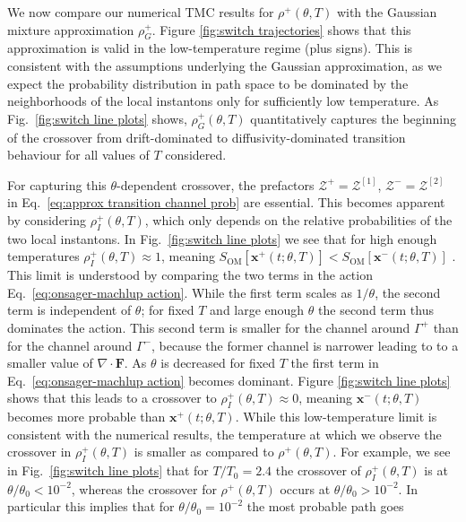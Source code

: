 We now compare our numerical TMC results for $\rho^{+}(\theta,T)$ with
the Gaussian mixture approximation $\rho_{G}^{+}$. Figure \ref{fig:switch trajectories} shows that this approximation is valid in the low-temperature regime
(plus signs). This is consistent with the assumptions underlying the
Gaussian approximation, as we expect the probability distribution
in path space to be dominated by the neighborhoods of the local instantons
only for sufficiently low temperature. As Fig.~\ref{fig:switch line plots} shows, $\rho_{G}^{+}(\theta,T)$ quantitatively captures the beginning
of the crossover from drift-dominated to diffusivity-dominated transition
behaviour for all values of $T$ considered.

For capturing this $\theta$-dependent crossover, the prefactors $\mathcal{Z}^{+}=\mathcal{Z}^{[1]}$,
$\mathcal{Z}^{-}=\mathcal{Z}^{[2]}$ in Eq.~\ref{eq:approx transition channel prob}
are essential. This becomes apparent by considering $\rho_{I}^{+}(\theta,T)$,
which only depends on the relative probabilities of the two local
instantons. In Fig.~\ref{fig:switch line plots} we see that for high enough
temperatures $\rho_{I}^{+}(\theta,T)\approx1$, meaning $S_{\text{OM}}[\mathbf{x}^{+}(t; \theta, T)]<S_{\text{OM}}[\mathbf{x}^{-}(t; \theta, T)]$
\citep{adibStochasticActionsDiffusive2008a}. This limit is understood
by comparing the two terms in the action Eq.~\ref{eq:onsager-machlup action}.
While the first term scales as $1/\theta$, the second term is independent
of $\theta$; for fixed $T$ and large enough $\theta$ the second
term thus dominates the action. This second term is smaller for the
channel around $\Gamma^{+}$ than for the channel around $\Gamma^{-}$,
because the former channel is narrower leading to to a smaller value
of $\nabla\cdot\mathbf{F}$. As $\theta$ is decreased for fixed $T$
the first term in Eq.~\ref{eq:onsager-machlup action} becomes
dominant. Figure \ref{fig:switch line plots} shows that this leads to a
crossover to $\rho_{I}^{+}(\theta,T)\approx0$, meaning $\mathbf{x}^{-}(t;\theta,T)$
becomes more probable than $\mathbf{x}^{+}(t;\theta,T)$. While this low-temperature
limit is consistent with the numerical results, the temperature at
which we observe the crossover in $\rho_{I}^{+}(\theta,T)$ is smaller
as compared to $\rho^{+}(\theta,T)$. For example, we see in Fig.~\ref{fig:switch line plots} that for $T/T_{0}=2.4$ the crossover of $\rho_{I}^{+}(\theta,T)$
is at $\theta/\theta_{0}<10^{-2}$, whereas the crossover for $\rho^{+}(\theta,T)$
occurs at $\theta/\theta_{0}>10^{-2}$. In particular this implies
that for $\theta/\theta_{0}=10^{-2}$ the most probable path goes
